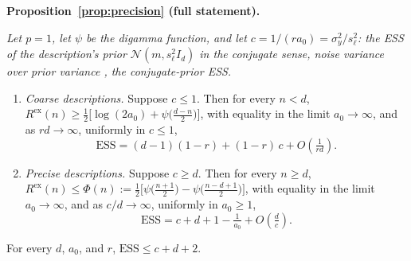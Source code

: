 \documentclass[10pt]{article}
\newcommand{\ess}{\mathrm{ESS}}
\begin{document}
\medskip\noindent\textbf{Proposition~\ref{prop:precision} (full statement).} {\itshape Let $p = 1$, let $\psi$ be the digamma function, and let $c = 1/(r a_0) = \sigma_y^2 / s_\ell^2$: the ESS of the description's prior $\mathcal{N}(m, s_\ell^2 I_d)$ in the conjugate sense, noise variance over prior variance \citep{neuenschwander2020}, the conjugate-prior ESS.
\begin{enumerate}
\item[(i)] \emph{Coarse descriptions.} Suppose $c \le 1$. Then for every $n < d$,
$R^{\mathrm{ex}}(n) \ge \tfrac12\big[\log(2a_0) + \psi\big(\tfrac{d-n}{2}\big)\big]$, with equality in the limit $a_0 \to \infty$, and as $rd \to \infty$, uniformly in $c \le 1$,
\[
\ess = (d-1)(1-r) + (1-r)\,c + O\!\left(\tfrac{1}{rd}\right).
\]
\item[(ii)] \emph{Precise descriptions.} Suppose $c \ge d$. Then for every $n \ge d$,
$R^{\mathrm{ex}}(n) \le \Phi(n) := \tfrac12\big[\psi\big(\tfrac{n+1}{2}\big) - \psi\big(\tfrac{n-d+1}{2}\big)\big]$, with equality in the limit $a_0 \to \infty$, and as $c/d \to \infty$, uniformly in $a_0 \ge 1$,
\[
\ess = c + d + 1 - \tfrac{1}{a_0} + O\!\left(\tfrac{d}{c}\right).
\]
\end{enumerate}
For every $d$, $a_0$, and $r$, $\ess \le c + d + 2$.}
\medskip
\end{document}
